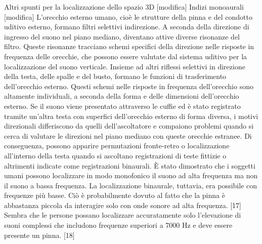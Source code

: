 {Altri spunti per la localizzazione dello spazio 3D [modifica]
Indizi monoaurali [modifica]
L'orecchio esterno umano, cioè le strutture della pinna e del condotto uditivo esterno, formano filtri selettivi in ​​direzione. A seconda della direzione di ingresso del suono nel piano mediano, diventano attive diverse risonanze del filtro. Queste risonanze tracciano schemi specifici della direzione nelle risposte in frequenza delle orecchie, che possono essere valutate dal sistema uditivo per la localizzazione del suono verticale. Insieme ad altri riflessi selettivi in ​​direzione della testa, delle spalle e del busto, formano le funzioni di trasferimento dell'orecchio esterno. Questi schemi nelle risposte in frequenza dell'orecchio sono altamente individuali, a seconda della forma e delle dimensioni dell'orecchio esterno. Se il suono viene presentato attraverso le cuffie ed è stato registrato tramite un'altra testa con superfici dell'orecchio esterno di forma diversa, i motivi direzionali differiscono da quelli dell'ascoltatore e compaiono problemi quando si cerca di valutare le direzioni nel piano mediano con queste orecchie estranee. Di conseguenza, possono apparire permutazioni fronte-retro o localizzazione all'interno della testa quando si ascoltano registrazioni di teste fittizie o altrimenti indicate come registrazioni binaurali. È stato dimostrato che i soggetti umani possono localizzare in modo monofonico il suono ad alta frequenza ma non il suono a bassa frequenza. La localizzazione binaurale, tuttavia, era possibile con frequenze più basse. Ciò è probabilmente dovuto al fatto che la pinna è abbastanza piccola da interagire solo con onde sonore ad alta frequenza. [17] Sembra che le persone possano localizzare accuratamente solo l'elevazione di suoni complessi che includono frequenze superiori a 7000 Hz e deve essere presente un pinna. [18]

}

